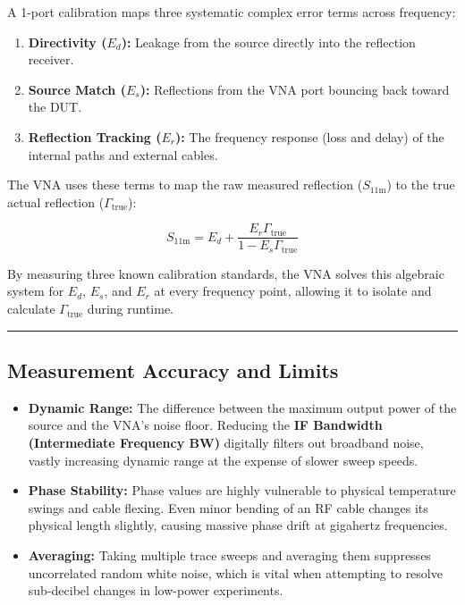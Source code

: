 \documentclass[
]{article}
\providecommand{\tightlist}{%
  \setlength{\itemsep}{0pt}\setlength{\parskip}{0pt}}
\begin{document}
A 1-port calibration maps three systematic complex error terms across
frequency:

\begin{enumerate}
\def\labelenumi{\arabic{enumi}.}
\tightlist
\item
  \textbf{Directivity (\(E_d\)):} Leakage from the source directly into
  the reflection receiver.
\item
  \textbf{Source Match (\(E_s\)):} Reflections from the VNA port
  bouncing back toward the DUT.
\item
  \textbf{Reflection Tracking (\(E_r\)):} The frequency response (loss
  and delay) of the internal paths and external cables.
\end{enumerate}

The VNA uses these terms to map the raw measured reflection
(\(S_{11\text{m}}\)) to the true actual reflection
(\(\Gamma_{\text{true}}\)):

\[S_{11\text{m}} = E_d + \frac{E_r \Gamma_{\text{true}}}{1 - E_s \Gamma_{\text{true}}}\]

By measuring three known calibration standards, the VNA solves this
algebraic system for \(E_d\), \(E_s\), and \(E_r\) at every frequency
point, allowing it to isolate and calculate \(\Gamma_{\text{true}}\)
during runtime.

\begin{center}\rule{0.5\linewidth}{0.5pt}\end{center}

\subsection{Measurement Accuracy and
Limits}\label{measurement-accuracy-and-limits}

\begin{itemize}
\tightlist
\item
  \textbf{Dynamic Range:} The difference between the maximum output
  power of the source and the VNA's noise floor. Reducing the \textbf{IF
  Bandwidth (Intermediate Frequency BW)} digitally filters out broadband
  noise, vastly increasing dynamic range at the expense of slower sweep
  speeds.
\item
  \textbf{Phase Stability:} Phase values are highly vulnerable to
  physical temperature swings and cable flexing. Even minor bending of
  an RF cable changes its physical length slightly, causing massive
  phase drift at gigahertz frequencies.
\item
  \textbf{Averaging:} Taking multiple trace sweeps and averaging them
  suppresses uncorrelated random white noise, which is vital when
  attempting to resolve sub-decibel changes in low-power experiments.
\end{itemize}
\end{document}
